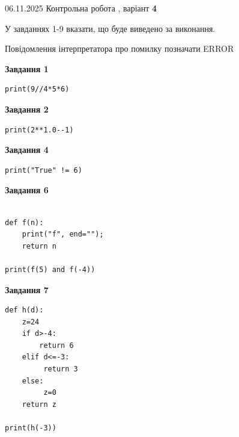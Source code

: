 \documentclass[12pt, ukrainian]{article}
\begin{document}
{\Large{06.11.2025 Контрольна робота , варіант  \No \textbf { 4 }\par}}
{
\begin {large}
У завданнях 1-9 вказати, що буде виведено за виконання.

Повідомлення інтерпретатора про помилку позначати ERROR

\begin{minipage}[t]{7.5cm}

\begin{center}
\textbf{Завдання 1}
\end{center}

\begin{verbatim}
print(9//4*5*6)
\end{verbatim}



\begin{center}
\textbf{Завдання 2}
\end{center}

\begin{verbatim}
print(2**1.0--1)
\end{verbatim}



\begin{center}
\textbf{Завдання 4}
\end{center}

\begin{verbatim}
print("True" != 6)
\end{verbatim}



\begin{center}
\textbf{Завдання 6}
\end{center}

\begin{verbatim}

def f(n):
    print("f", end="");
    return n

print(f(5) and f(-4))
\end{verbatim}



\begin{center}
\textbf{Завдання 7}
\end{center}

\begin{verbatim}
def h(d):
    z=24
    if d>-4: 
        return 6
    elif d<=-3:
         return 3
    else:
         z=0
    return z

print(h(-3))
\end{verbatim}


\end{minipage}
\end{large}}
\end{document}
